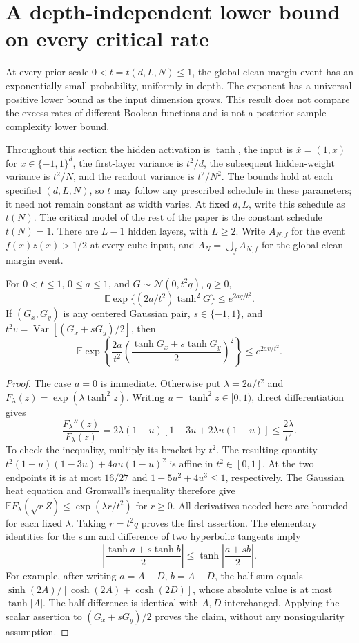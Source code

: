 \section{A depth-independent lower bound on every critical rate}
\label{sec:critical-universal-baseline}

At every prior scale $0<t=t(d,L,N)\le1$, the global clean-margin event has an
exponentially small probability, uniformly in depth. The exponent has a
universal positive lower bound as the input dimension grows. This result
does not compare the excess rates of different Boolean functions and is
not a posterior sample-complexity lower bound.

Throughout this section the hidden activation is $\tanh$, the input is
$\bar x=(1,x)$ for $x\in\{-1,1\}^d$, the first-layer variance is $t^2/d$,
the subsequent hidden-weight variance is $t^2/N$, and the readout variance
is $t^2/N^2$. The bounds hold at each specified $(d,L,N)$, so $t$
may follow any prescribed schedule in these parameters; it need not remain
constant as width varies. At fixed $d,L$, write this schedule as $t(N)$.
The critical model of the rest of the paper is the constant schedule
$t(N)=1$. There are $L-1$ hidden layers, with $L\ge2$.
Write $A_{N,f}$ for the event $f(x)z(x)>1/2$ at every cube input, and
$A_N=\bigcup_f A_{N,f}$ for the global clean-margin event.

\begin{lemma}
\label{lem:critical-exponential-potential}
For $0<t\le1$, $0\le a\le1$, and $G\sim\mathcal N(0,t^2q)$, $q\ge0$,
\[
 \mathbb E\exp\{(2a/t^2)\tanh^2G\}\le e^{2aq/t^2}.
\]
If $(G_x,G_y)$ is any centered Gaussian pair, $s\in\{-1,1\}$,
and $t^2v=\operatorname{Var}[(G_x+sG_y)/2]$, then
\[
 \mathbb E\exp\left\{\frac{2a}{t^2}\left(
       \frac{\tanh G_x+s\tanh G_y}{2}\right)^2\right\}
 \le e^{2av/t^2}.
\]
\end{lemma}

\begin{proof}
The case $a=0$ is immediate. Otherwise put $\lambda=2a/t^2$ and
$F_\lambda(z)=\exp(\lambda\tanh^2z)$. Writing
$u=\tanh^2z\in[0,1)$, direct differentiation gives
\[
 \frac{F_\lambda''(z)}{F_\lambda(z)}
 =2\lambda(1-u)[1-3u+2\lambda u(1-u)]\le\frac{2\lambda}{t^2}.
\]
To check the inequality, multiply its bracket by $t^2$. The resulting
quantity $t^2(1-u)(1-3u)+4a u(1-u)^2$ is affine in $t^2\in[0,1]$.
At the two endpoints it is at most $16/27$ and
$1-5u^2+4u^3\le1$, respectively.
The Gaussian heat equation and Gronwall's inequality therefore give
$\mathbb E F_\lambda(\sqrt r Z)\le\exp(\lambda r/t^2)$ for $r\ge0$.
All derivatives needed here are bounded for each fixed $\lambda$.
Taking $r=t^2q$ proves the first assertion.
The elementary identities for the sum and difference of two hyperbolic
tangents imply
\[
 \left|\frac{\tanh a+s\tanh b}{2}\right|
 \le\tanh\left|\frac{a+sb}{2}\right|.
\]
For example, after writing $a=A+D$, $b=A-D$, the half-sum equals
$\sinh(2A)/[\cosh(2A)+\cosh(2D)]$, whose absolute value is at most
$\tanh|A|$. The half-difference is identical with $A,D$ interchanged.
Applying the scalar assertion to $(G_x+sG_y)/2$ proves the claim,
without any nonsingularity assumption.
\end{proof}

